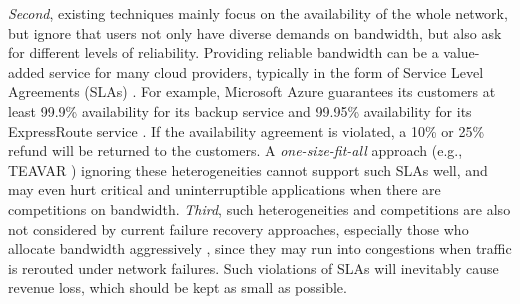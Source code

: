 \documentclass[sigconf]{acmart}
\begin{document}
\textit{Second}, existing techniques mainly focus on the availability of the whole network, but ignore that users not only have diverse demands on bandwidth,  but also ask for different levels of reliability. Providing reliable bandwidth can be a value-added service for many cloud providers, typically in the form of 
Service Level Agreements (SLAs) \cite{amazon,azure}.
For example, Microsoft Azure guarantees its customers at least 99.9\% availability for its backup service and 99.95\% availability for its ExpressRoute service \cite{azure}.
If the availability agreement is violated, a 10\% or 25\% refund will be returned to the customers.
A \textit{one-size-fit-all} approach (e.g., TEAVAR \cite{Teavar})  ignoring these heterogeneities cannot support such SLAs well, and may even hurt critical and uninterruptible applications when there are competitions on bandwidth. 
\textit{Third}, 
such heterogeneities and competitions are also not considered by current failure recovery approaches, especially those who allocate bandwidth aggressively \cite{Teavar,swan}, since they may run into congestions when traffic is rerouted under network failures. 
Such violations of SLAs will inevitably cause revenue loss, which should be kept as small as possible. 
\end{document}
